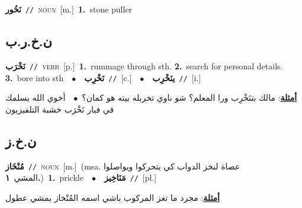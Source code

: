 \documentclass[10pt,a4paper,twoside]{article} %
\begin{document}
\begin{multicols}{2}
{\setlength\topsep{0pt}\textbf{\foreignlanguage{arabic}{نَخُور}}\ {\color{gray}\texttt{//}\color{black}}\ \textsc{noun}\ [m.]\ \textbf{1.}~stone puller\ } \vspace{2mm}

\vspace{-3mm}
\subsection*{\color{blue}\foreignlanguage{arabic}{ن.خ.ر.ب}\color{blue}{}} 

{\setlength\topsep{0pt}\textbf{\foreignlanguage{arabic}{نَخْرَب}}\ {\color{gray}\texttt{//}\color{black}}\ \textsc{verb}\ [p.]\ \textbf{1.}~rummage through sth.  \textbf{2.}~search for personal details.  \textbf{3.}~bore into sth\ \ $\bullet$\ \ \setlength\topsep{0pt}\textbf{\foreignlanguage{arabic}{نَخْرِب}}\ {\color{gray}\texttt{//}\color{black}}\ [c.]\ \ $\bullet$\ \ \setlength\topsep{0pt}\textbf{\foreignlanguage{arabic}{ينَخْرِب}}\ {\color{gray}\texttt{//}\color{black}}\ [i.]\  \begin{flushright}\color{gray}\foreignlanguage{arabic}{\textbf{\underline{\foreignlanguage{arabic}{أمثلة}}}: مالك بتنَخْرِب ورا المعلم؟ شو ناوي تخربله بيته هو كمان؟\ $\bullet$\ \  أخوي الله يسلمك في فيار نَخْرَب خشبة التلفيزيون}\end{flushright}\color{black}} \vspace{2mm}

\vspace{-3mm}
\subsection*{\color{blue}\foreignlanguage{arabic}{ن.خ.ز}\color{blue}{}} 

{\setlength\topsep{0pt}\textbf{\foreignlanguage{arabic}{مُنْخَاز}}\ {\color{gray}\texttt{//}\color{black}}\ \textsc{noun}\ [m.]\ \color{gray}(msa. \foreignlanguage{arabic}{عصاة لنخز الدواب كي يتحركوا ويواصلوا المشي}~\foreignlanguage{arabic}{\textbf{١.}})\color{black}\ \textbf{1.}~prickle\ \ $\bullet$\ \ \setlength\topsep{0pt}\textbf{\foreignlanguage{arabic}{مَنَاخِيز}}\ {\color{gray}\texttt{//}\color{black}}\ [pl.]\  \begin{flushright}\color{gray}\foreignlanguage{arabic}{\textbf{\underline{\foreignlanguage{arabic}{أمثلة}}}: مجرد ما تغز المركوب باشي اسمه المُنْخاز بمشي عطول}\end{flushright}\color{black}} \vspace{2mm}


\end{multicols}
\end{document}
